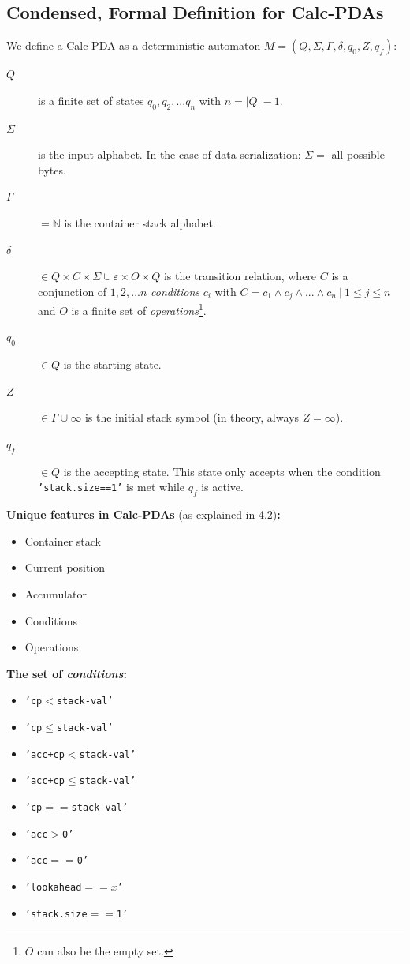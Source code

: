\subsection{Condensed, Formal Definition for Calc-PDAs}
\label{4.8}
We define a Calc-PDA as a deterministic automaton $M=(Q,\Sigma,\Gamma, \delta, q_0,Z,q_f)$:
\begin{description}
    \item[$Q$] is a finite set of states $q_0, q_2,...q_n$ with $n = |Q|-1$.
    \item[$\Sigma$] is the input alphabet. In the case of data serialization: $\Sigma =$ all possible bytes.
    \item[$\Gamma$] $=\mathbb{N}$ is the container stack alphabet.
    \item[$\delta$] $\in Q \times C \times \Sigma\cup\varepsilon \times O \times Q$ is the transition relation, where $C$ is a conjunction of $1,2,...n$ \textit{conditions} $c_i$ with $C=c_1 \land c_j \land ... \land c_n \ |\ 1 \leq j \leq n$ and $O$ is a finite set of \textit{operations}\footnote{$O$ can also be the empty set.}.
    \item[$q_0$] $\in Q$ is the starting state.
    \item[$Z$] $\in \Gamma\cup\infty$ is the initial stack symbol (in theory, always $Z=\infty$).
    \item[$q_f$] $\in Q$ is the accepting state. This state only accepts when the condition \texttt{'stack.size==1'} is met while $q_f$ is active.
\end{description}
\textbf{Unique features in Calc-PDAs} (as explained in \hyperref[4.2]{4.2})\textbf{:}
\begin{itemize}
    \item Container stack
    \item Current position
    \item Accumulator
    \item Conditions
    \item Operations
\end{itemize}\vspace{10pt}
\textbf{The set of \textit{conditions}:}
\begin{itemize}
    \item \texttt{'cp$<$stack-val'}
    \item \texttt{'cp$\leq$stack-val'}
    \item \texttt{'acc+cp$<$stack-val'}
    \item \texttt{'acc+cp$\leq$stack-val'}
    \item \texttt{'cp$==$stack-val'}
    \item \texttt{'acc$>$0'}
    \item \texttt{'acc$==$0'}
    \item \texttt{'lookahead$==x$'}
    \item \texttt{'stack.size$==$1'}
\end{itemize}
